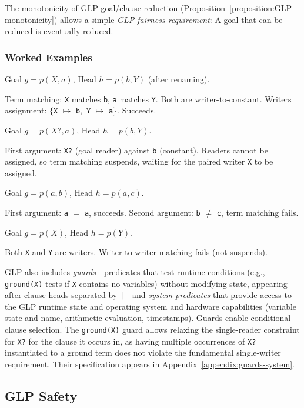 The monotonicity of GLP goal/clause reduction (Proposition~\ref{proposition:GLP-monotonicity}) allows a simple \emph{GLP fairness requirement}: A goal that can be reduced is eventually reduced.


\subsubsection{Worked Examples}

Goal $g = p(X, a)$, Head $h = p(b, Y)$ (after renaming).

Term matching: \verb|X| matches \verb|b|, \verb|a| matches \verb|Y|. Both are writer-to-constant.
Writers assignment: $\{$\verb|X| $\mapsto$ \verb|b|$,$ \verb|Y| $\mapsto$ \verb|a|$\}$. Succeeds.

Goal $g = p(X?, a)$, Head $h = p(b, Y)$.

First argument: \verb|X?| (goal reader) against \verb|b| (constant). Readers cannot be assigned, so term matching suspends, waiting for the paired writer \verb|X| to be assigned.

Goal $g = p(a, b)$, Head $h = p(a, c)$.

First argument: \verb|a| $=$ \verb|a|, succeeds. Second argument: \verb|b| $\ne$ \verb|c|, term matching fails.

Goal $g = p(X)$, Head $h = p(Y)$.

Both \verb|X| and \verb|Y| are writers. Writer-to-writer matching fails (not suspends).

GLP also includes \emph{guards}—predicates that test runtime conditions (e.g., \verb|ground(X)| tests if \verb|X| contains no variables) without modifying state, appearing after clause heads separated by \verb=|=—and \emph{system predicates} that provide access to the GLP runtime state and operating system and hardware capabilities (variable state and name, arithmetic evaluation, timestamps). Guards enable conditional clause selection. The \verb|ground(X)| guard allows relaxing the single-reader constraint for \verb|X?| for the clause it occurs in, as having multiple occurrences of \verb|X?| instantiated to a ground term does not violate the fundamental single-writer requirement.
Their specification appears in Appendix~\ref{appendix:guards-system}.

\subsection{GLP Safety}

